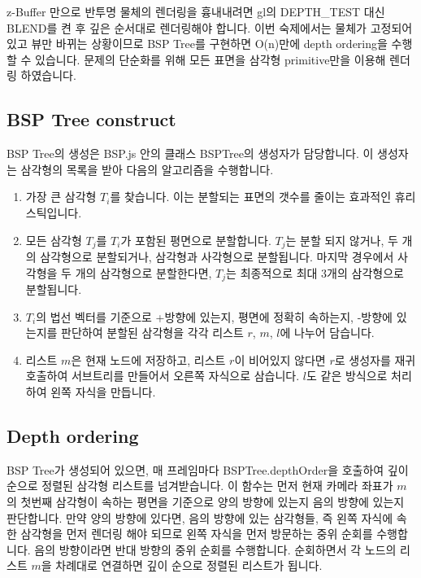 \documentclass{article}
\begin{document}
z-Buffer 만으로 반투명 물체의 렌더링을 흉내내려면 gl의 DEPTH\_TEST 대신 BLEND를 켠 후 깊은 순서대로 렌더링해야 합니다.
이번 숙제에서는 물체가 고정되어 있고 뷰만 바뀌는 상황이므로 BSP Tree를 구현하면 O(n)만에 depth ordering을 수행할 수 있습니다.
문제의 단순화를 위해 모든 표면을 삼각형 primitive만을 이용해 렌더링 하였습니다.

\subsection{BSP Tree construct}

BSP Tree의 생성은 BSP.js 안의 클래스 BSPTree의 생성자가 담당합니다.
이 생성자는 삼각형의 목록을 받아 다음의 알고리즘을 수행합니다.

\begin{enumerate}
  \item
    가장 큰 삼각형 $T_i$를 찾습니다.
    이는 분할되는 표면의 갯수를 줄이는 효과적인 휴리스틱입니다.
  \item
    모든 삼각형 $T_j$를 $T_i$가 포함된 평면으로 분할합니다.
    $T_j$는 분할 되지 않거나, 두 개의 삼각형으로 분할되거나, 삼각형과 사각형으로 분할됩니다.
    마지막 경우에서 사각형을 두 개의 삼각형으로 분할한다면, $T_j$는 최종적으로 최대 3개의 삼각형으로 분할됩니다.
  \item
    $T_i$의 법선 벡터를 기준으로 +방향에 있는지, 평면에 정확히 속하는지, -방향에 있는지를 판단하여 분할된 삼각형을 각각 리스트 $r$, $m$, $l$에 나누어 담습니다.
  \item
    리스트 $m$은 현재 노드에 저장하고, 리스트 $r$이 비어있지 않다면 $r$로 생성자를 재귀호출하여 서브트리를 만들어서 오른쪽 자식으로 삼습니다.
    $l$도 같은 방식으로 처리하여 왼쪽 자식을 만듭니다.
\end{enumerate}

\subsection{Depth ordering}

BSP Tree가 생성되어 있으면, 매 프레임마다 BSPTree.depthOrder을 호출하여 깊이 순으로 정렬된 삼각형 리스트를 넘겨받습니다.
이 함수는 먼저 현재 카메라 좌표가 $m$의 첫번째 삼각형이 속하는 평면을 기준으로 양의 방향에 있는지 음의 방향에 있는지 판단합니다.
만약 양의 방향에 있다면, 음의 방향에 있는 삼각형들, 즉 왼쪽 자식에 속한 삼각형을 먼저 렌더링 해야 되므로 왼쪽 자식을 먼저 방문하는 중위 순회를 수행합니다.
음의 방향이라면 반대 방향의 중위 순회를 수행합니다.
순회하면서 각 노드의 리스트 $m$을 차례대로 연결하면 깊이 순으로 정렬된 리스트가 됩니다.
\end{document}
